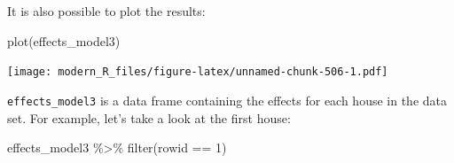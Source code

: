 \documentclass[
]{article}
\newenvironment{Shaded}{\begin{snugshade}}{\end{snugshade}}
\newcommand{\DecValTok}[1]{\textcolor[rgb]{0.00,0.00,0.81}{#1}}
\newcommand{\FunctionTok}[1]{\textcolor[rgb]{0.00,0.00,0.00}{#1}}
\newcommand{\NormalTok}[1]{#1}
\newcommand{\SpecialCharTok}[1]{\textcolor[rgb]{0.00,0.00,0.00}{#1}}
\begin{document}
It is also possible to plot the results:

\begin{Shaded}
\begin{Highlighting}[]
\FunctionTok{plot}\NormalTok{(effects\_model3)}
\end{Highlighting}
\end{Shaded}

\texttt{[image: modern\_R\_files/figure-latex/unnamed-chunk-506-1.pdf]}

\texttt{effects\_model3} is a data frame containing the effects for each house in the data set. For example,
let's take a look at the first house:

\begin{Shaded}
\begin{Highlighting}[]
\NormalTok{effects\_model3 }\SpecialCharTok{\%\textgreater{}\%}
  \FunctionTok{filter}\NormalTok{(rowid }\SpecialCharTok{==} \DecValTok{1}\NormalTok{)}
\end{Highlighting}
\end{Shaded}
\end{document}
